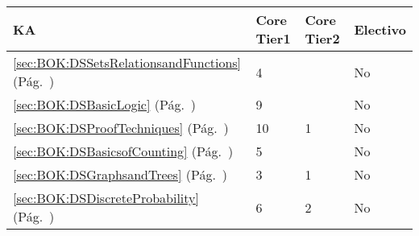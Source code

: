 \begin{center}
\begin{tabularx}{\textwidth}{|X|p{1cm}|p{1cm}|p{1.4cm}|}\hline
\textbf{\acf{KA}} & \textbf{Core Tier1} & \textbf{Core Tier2} & \textbf{Electivo} \\ \hline
\ref{sec:BOK:DSSetsRelationsandFunctions} \htmlref{\DSSetsRelationsandFunctions}{sec:BOK:DSSetsRelationsandFunctions}\xspace (Pág.~\pageref{sec:BOK:DSSetsRelationsandFunctions}) & 4 & ~ & No \\ \hline
\ref{sec:BOK:DSBasicLogic} \htmlref{\DSBasicLogic}{sec:BOK:DSBasicLogic}\xspace (Pág.~\pageref{sec:BOK:DSBasicLogic}) & 9 & ~ & No \\ \hline
\ref{sec:BOK:DSProofTechniques} \htmlref{\DSProofTechniques}{sec:BOK:DSProofTechniques}\xspace (Pág.~\pageref{sec:BOK:DSProofTechniques}) & 10 & 1 & No \\ \hline
\ref{sec:BOK:DSBasicsofCounting} \htmlref{\DSBasicsofCounting}{sec:BOK:DSBasicsofCounting}\xspace (Pág.~\pageref{sec:BOK:DSBasicsofCounting}) & 5 & ~ & No \\ \hline
\ref{sec:BOK:DSGraphsandTrees} \htmlref{\DSGraphsandTrees}{sec:BOK:DSGraphsandTrees}\xspace (Pág.~\pageref{sec:BOK:DSGraphsandTrees}) & 3 & 1 & No \\ \hline
\ref{sec:BOK:DSDiscreteProbability} \htmlref{\DSDiscreteProbability}{sec:BOK:DSDiscreteProbability}\xspace (Pág.~\pageref{sec:BOK:DSDiscreteProbability}) & 6 & 2 & No \\ \hline
\end{tabularx}
\end{center}

